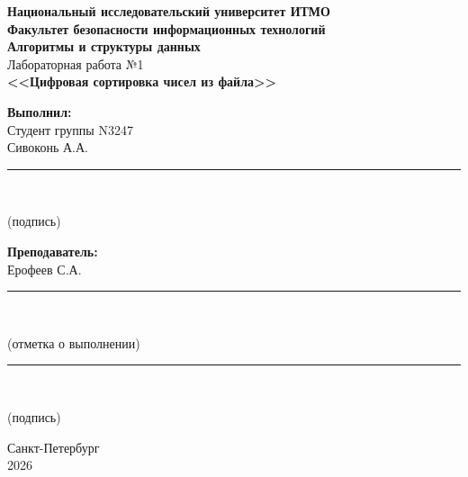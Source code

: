 \documentclass[a4paper,14pt]{extarticle}
\begin{document}
\begin{titlepage}
\begin{center}

\textbf{Национальный исследовательский университет ИТМО}\\[0.5cm]
\textbf{Факультет безопасности информационных технологий}\\[2cm]

{\Large\textbf{Алгоритмы и структуры данных}}\\[1cm]
{\large Лабораторная работа №1}\\[0.5cm]
{\large\textbf{<<Цифровая сортировка чисел из файла>>}}\\[3cm]

\begin{flushright}
\begin{minipage}{0.45\textwidth}
\textbf{Выполнил:}\\
Студент группы N3247{\hspace{3cm}}\\
Сивоконь А.А. {\hspace{5cm}}\\[1cm]

\noindent\rule{6cm}{0.4pt}\\
\centerline{(подпись)}

\vspace{0.5cm}

\textbf{Преподаватель:}\\
Ерофеев С.А. {\hspace{5cm}}\\[1cm]
\noindent\rule{6cm}{0.4pt}\\
\centerline{(отметка о выполнении)}

\vspace{1.5cm}

\noindent\rule{6cm}{0.4pt}\\
\centerline{(подпись)}
\end{minipage}
\end{flushright}

\vfill

Санкт-Петербург\\
2026

\end{center}
\end{titlepage}

\newpage
\renewcommand{\contentsname}{Содержание}
\tableofcontents
\end{document}
